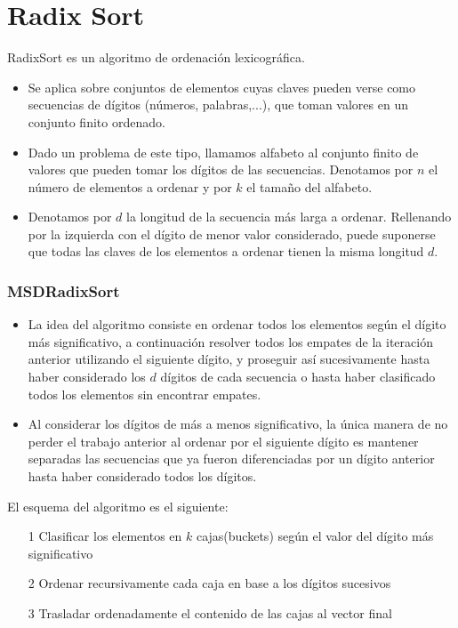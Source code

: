 \documentclass{beamer}
\begin{document}
\section{Radix Sort}

\begin{frame}
  \alert{RadixSort} es un algoritmo de ordenación lexicográfica.
  \begin{itemize}
  	\item Se aplica sobre conjuntos de elementos cuyas claves pueden verse como secuencias de \alert{dígitos} (números, palabras,...), que toman valores en un conjunto finito ordenado.
  	\item Dado un problema de este tipo, llamamos \alert{alfabeto} al conjunto finito de valores que pueden tomar los dígitos de las secuencias. Denotamos por $n$ el número de elementos a ordenar y por $k$ el tamaño del alfabeto.
  	\item Denotamos por $d$ la longitud de la secuencia más larga a ordenar. Rellenando por la izquierda con el dígito de menor valor considerado, puede suponerse que todas las claves de los elementos a ordenar tienen la misma longitud $d$.
  \end{itemize}
\end{frame}

\begin{frame}
 \frametitle{MSDRadixSort}
 \begin{itemize}
 	\item La idea del algoritmo consiste en ordenar todos los elementos según el dígito más significativo, a continuación resolver todos los empates de la iteración anterior utilizando el siguiente dígito, y proseguir así sucesivamente hasta haber considerado los $d$ dígitos de cada secuencia o hasta haber clasificado todos los elementos sin encontrar empates.
 	\item  Al considerar los dígitos de más a menos significativo, la única manera de no perder el trabajo anterior al ordenar por el siguiente dígito es mantener separadas las secuencias que ya fueron diferenciadas por un dígito anterior hasta haber considerado todos los dígitos.
 \end{itemize}
 El esquema del algoritmo es el siguiente:
 \begin{itemize}
 	\item [1] Clasificar los elementos en $k$ cajas(\alert{buckets}) según el valor del dígito más significativo
 	\item[2] Ordenar recursivamente cada caja en base a los dígitos sucesivos
 	\item[3] Trasladar ordenadamente el contenido de las cajas al vector final
 \end{itemize}
\end{frame}
\end{document}
